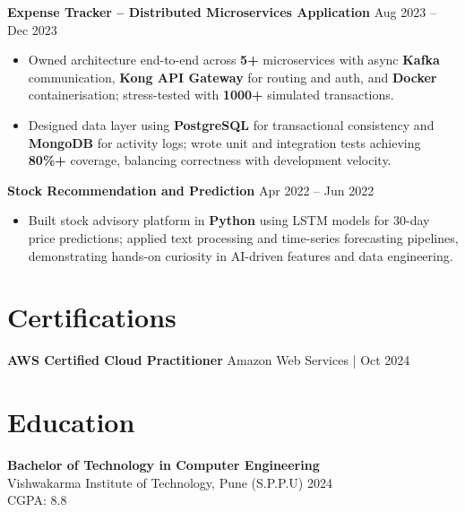 \documentclass[a4paper,10pt]{article}
\begin{document}
\textbf{Expense Tracker -- Distributed Microservices Application} \hfill Aug 2023 -- Dec 2023
\begin{itemize}[leftmargin=*]
    \item Owned architecture end-to-end across \textbf{5+} microservices with async \textbf{Kafka} communication, \textbf{Kong API Gateway} for routing and auth, and \textbf{Docker} containerisation; stress-tested with \textbf{1000+} simulated transactions.
    \item Designed data layer using \textbf{PostgreSQL} for transactional consistency and \textbf{MongoDB} for activity logs; wrote unit and integration tests achieving \textbf{80\%+} coverage, balancing correctness with development velocity.
\end{itemize}
\textbf{Stock Recommendation and Prediction} \hfill Apr 2022 -- Jun 2022
\begin{itemize}[leftmargin=*]
    \item Built stock advisory platform in \textbf{Python} using LSTM models for 30-day price predictions; applied text processing and time-series forecasting pipelines, demonstrating hands-on curiosity in AI-driven features and data engineering.
\end{itemize}

\section*{Certifications}
\textbf{AWS Certified Cloud Practitioner} \hfill Amazon Web Services \;|\; Oct 2024 \\

\section*{Education}

\textbf{Bachelor of Technology in Computer Engineering} \\
Vishwakarma Institute of Technology, Pune (S.P.P.U) \hfill 2024 \\
CGPA: 8.8
\end{document}
